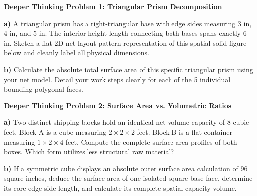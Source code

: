 \documentclass[12pt, letterpaper, fleqn]{article}
\begin{document}
\newpage

\begin{tcolorbox}[colback=white, colframe=black, boxrule=1pt, arc=4mm, left=6mm, right=6mm, top=5mm, bottom=5mm]
\textbf{Deeper Thinking Problem 1: Triangular Prism Decomposition}

\medskip
\noindent
\textbf{a)} A triangular prism has a right-triangular base with edge sides measuring 3 in, 4 in, and 5 in. The interior height length connecting both bases spans exactly 6 in. Sketch a flat 2D net layout pattern representation of this spatial solid figure below and cleanly label all physical dimensions.
\vspace{7cm}

\noindent
\textbf{b)} Calculate the absolute total surface area of this specific triangular prism using your net model. Detail your work steps clearly for each of the 5 individual bounding polygonal faces.
\vspace{8cm}
\end{tcolorbox}

\vspace{4mm}

\begin{tcolorbox}[colback=white, colframe=black, boxrule=1pt, arc=4mm, left=6mm, right=6mm, top=5mm, bottom=5mm]
\textbf{Deeper Thinking Problem 2: Surface Area vs. Volumetric Ratios}

\medskip
\noindent
\textbf{a)} Two distinct shipping blocks hold an identical net volume capacity of 8 cubic feet. Block A is a cube measuring $2 \times 2 \times 2$ feet. Block B is a flat container measuring $1 \times 2 \times 4$ feet. Compute the complete surface area profiles of both boxes. Which form utilizes less structural raw material?
\vspace{7cm}

\noindent
\textbf{b)} If a symmetric cube displays an absolute outer surface area calculation of 96 square inches, deduce the surface area of one isolated square base face, determine its core edge side length, and calculate its complete spatial capacity volume.
\vspace{8cm}
\end{tcolorbox}

\newpage
\end{document}
